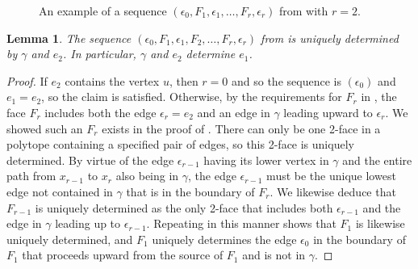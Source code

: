 \documentclass[12pt]{amsart}
\theoremstyle{plain}
\newtheorem{lem}[thm]{Lemma}
\theoremstyle{definition}
\theoremstyle{remark}
\begin{document}
\begin{figure}
\caption{An example of a sequence $(\epsilon_0,F_1,\epsilon_1,\dots ,F_r,\epsilon_r)$ from  with  $r=2$.}
\label{fig:edge-face-sequence}
\end{figure}


\begin{lem}\label{lem:what-determines}
 The sequence $(\epsilon_0,F_1,\epsilon_1,F_2,\dots ,F_r,\epsilon_r)$ from  
  is uniquely determined by $\gamma $ and $e_2$. In particular, $\gamma$ and $e_2$ determine $e_1$. 
\end{lem}
\begin{proof}
If $e_2$ contains the vertex $u$, then $r=0$ and so the sequence is $(\epsilon_0)$ and $e_1=e_2$, so the claim is satisfied. Otherwise, by the requirements for $F_r$  in  , the face $F_r$ includes both the edge $\epsilon_r=e_2$ and an edge in $\gamma $ leading upward to $\epsilon_r$.  We showed such an $F_r$ exists in the proof of . There can only be one 2-face in a polytope containing a specified pair of edges, so this 2-face is uniquely determined.  By virtue of  the edge $\epsilon_{r-1}$ having its lower vertex  in $\gamma $ and the entire path from $x_{r-1}$ to $x_r$ also being  in $\gamma $, 
the edge $\epsilon_{r-1}$ must be the unique  lowest edge  not contained in $\gamma $ that is in the boundary of $F_r$.  We likewise deduce  that  $F_{r-1}$ is  uniquely determined as the only 2-face that includes both $\epsilon_{r-1}$ and the edge in $\gamma $ leading up to  $\epsilon_{r-1}$.  Repeating in this manner shows that $F_1$ is likewise uniquely determined, and $F_1$  uniquely determines the edge $\epsilon_0$  in the  boundary of $F_1$ that proceeds upward from the source of $F_1$ and is not in $\gamma $.
\end{proof}
\end{document}

